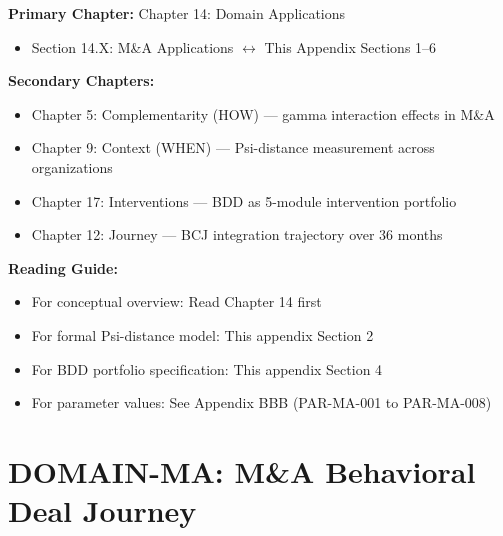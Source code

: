 \begin{tcolorbox}[colback=purple!5!white, colframe=purple!75!black,
    title=Chapter Linkage]

\textbf{Primary Chapter:} Chapter 14: Domain Applications
\begin{itemize}[nosep]
\item Section 14.X: M\&A Applications $\leftrightarrow$ This Appendix Sections 1--6
\end{itemize}

\textbf{Secondary Chapters:}
\begin{itemize}[nosep]
\item Chapter 5: Complementarity (HOW) --- gamma interaction effects in M\&A
\item Chapter 9: Context (WHEN) --- Psi-distance measurement across organizations
\item Chapter 17: Interventions --- BDD as 5-module intervention portfolio
\item Chapter 12: Journey --- BCJ integration trajectory over 36 months
\end{itemize}

\textbf{Reading Guide:}
\begin{itemize}[nosep]
\item For conceptual overview: Read Chapter 14 first
\item For formal Psi-distance model: This appendix Section 2
\item For BDD portfolio specification: This appendix Section 4
\item For parameter values: See Appendix BBB (PAR-MA-001 to PAR-MA-008)
\end{itemize}

\end{tcolorbox}


\chapter{DOMAIN-MA: M\&A Behavioral Deal Journey}
\label{app:domain-ma}

